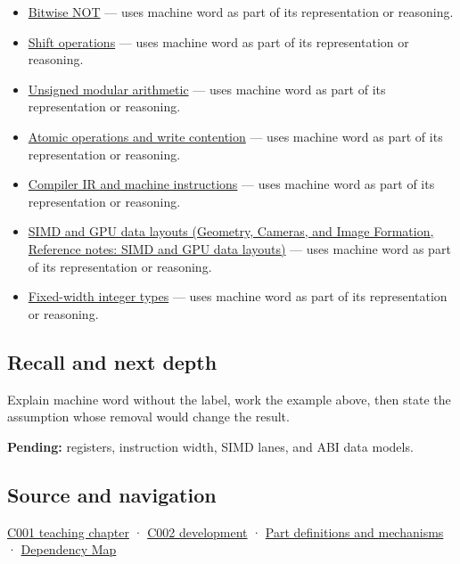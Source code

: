\begin{itemize}
\tightlist
\item
  \hyperref[appendix-8f38927cfc54]{Bitwise NOT} --- uses machine word as part of its representation or reasoning.
\item
  \hyperref[appendix-73425b25118e]{Shift operations} --- uses machine word as part of its representation or reasoning.
\item
  \hyperref[appendix-c99977d88b33]{Unsigned modular arithmetic} --- uses machine word as part of its representation or reasoning.
\item
  \hyperref[appendix-e12d1b03fefb]{Atomic operations and write contention} --- uses machine word as part of its representation or reasoning.
\item
  \hyperref[appendix-942ad41afb30]{Compiler IR and machine instructions} --- uses machine word as part of its representation or reasoning.
\item
  \href{../03-Geometry-Cameras-and-Image-Formation/main.pdf\#nameddest=appendix-3c7b1a56de01}{SIMD and GPU data layouts (Geometry, Cameras, and Image Formation, Reference notes: SIMD and GPU data layouts)} --- uses machine word as part of its representation or reasoning.
\item
  \hyperref[appendix-cc04044b5782]{Fixed-width integer types} --- uses machine word as part of its representation or reasoning.
\end{itemize}

\subsection{Recall and next depth}\label{appendix-d67a19507dc5-recall-and-next-depth}

Explain machine word without the label, work the example above, then state the assumption whose removal would change the result.

\textbf{Pending:} registers, instruction width, SIMD lanes, and ABI data models.

\subsection{Source and navigation}\label{appendix-d67a19507dc5-source-and-navigation}

\hyperref[01-foundations-i-ch001-from-a-signal-to-an-interpretation]{C001 teaching chapter} · \hyperref[01-foundations-i-ch001-arithmetic-becomes-a-policy]{C002 development} · \hyperref[appendix-fd090d982a15]{Part definitions and mechanisms} · \hyperref[appendix-4ad47bdd269a]{Dependency Map}
